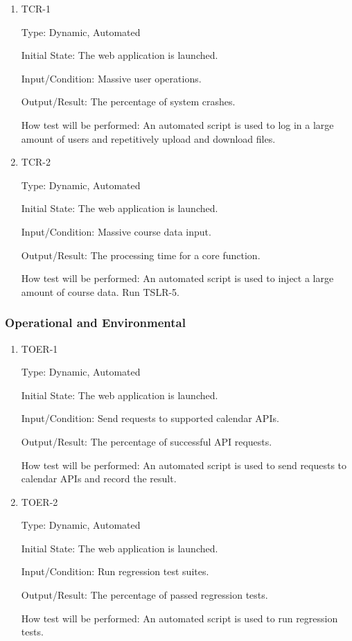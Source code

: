 \documentclass[12pt, titlepage]{article}
\begin{document}
\begin{enumerate}
\item{TCR-1\\}

Type: Dynamic, Automated
					
Initial State: The web application is launched.
					
Input/Condition: Massive user operations.
					
Output/Result: The percentage of system crashes.
					
How test will be performed: An automated script is used to log in a large amount of users and repetitively upload and download files.

\item{TCR-2\\}

Type: Dynamic, Automated
					
Initial State: The web application is launched.
					
Input/Condition: Massive course data input.
					
Output/Result: The processing time for a core function.
					
How test will be performed: An automated script is used to inject a large amount of course data.  Run TSLR-5.

\end{enumerate}

\subsubsection{Operational  and Environmental}

\begin{enumerate}
\item{TOER-1\\}

Type: Dynamic, Automated
					
Initial State: The web application is launched.
					
Input/Condition: Send requests to supported calendar APIs.
					
Output/Result: The percentage of successful API requests.
					
How test will be performed: An automated script is used to send requests to calendar APIs and record the result.


\item{TOER-2\\}

Type: Dynamic, Automated
					
Initial State: The web application is launched.
					
Input/Condition: Run regression test suites.
					
Output/Result: The percentage of passed regression tests.
					
How test will be performed: An automated script is used to run regression tests.

\end{enumerate}
\end{document}
